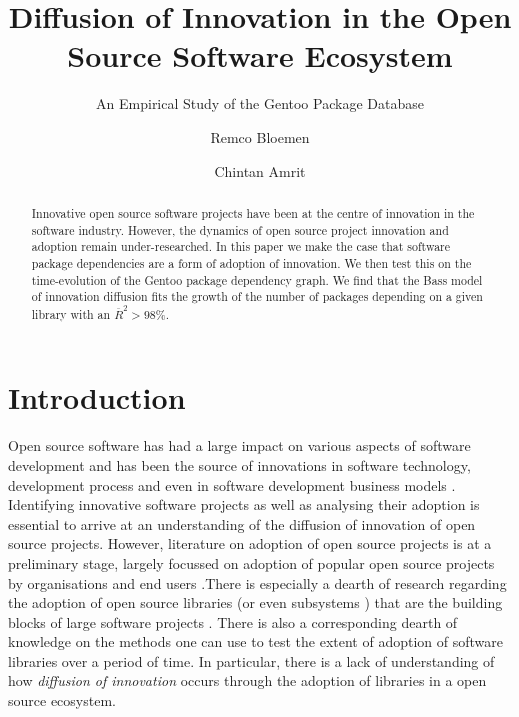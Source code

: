 \documentclass[smallextended,final]{svjour3}
\begin{document}
\title{Diffusion of Innovation in the Open Source Software Ecosystem}
\subtitle{An Empirical Study of the Gentoo Package Database} 
\dedication{}
\author{Remco Bloemen \and Chintan Amrit}

\maketitle


\begin{abstract}
Innovative open source software projects have been at the centre of innovation in the software industry. However, the dynamics of open source project innovation and adoption remain under-researched.
In this paper we make the case that software package dependencies are a form of  adoption of innovation. We then test this on the time-evolution of the Gentoo package dependency graph. We find that the Bass model of innovation diffusion fits the growth of the number of packages depending on a given library with an $\overline{R}^2 > 98\%$.
\end{abstract}


\section{Introduction}

Open source software has had a large impact on various aspects of software development and has been the source of  innovations in software technology, development process and even in software development business models \citep{ebert07}. Identifying innovative software projects as well as analysing their adoption is essential to arrive at an understanding of the diffusion of innovation of open source projects. However, literature on adoption of open source projects is at a preliminary stage, largely focussed on adoption of popular open source projects by organisations and end users \citep{aksulu10}.There is especially a dearth of research regarding the adoption of open source libraries (or even subsystems \citep{maccormack06}) that are the building blocks of large software projects \citep{szyperski04}. There is also a corresponding dearth of knowledge on the methods one can use to test the extent of adoption of software libraries over a period of time. In particular, there is a lack of understanding of how \emph{diffusion of innovation} occurs through the adoption of libraries in a open source ecosystem.
\end{document}
